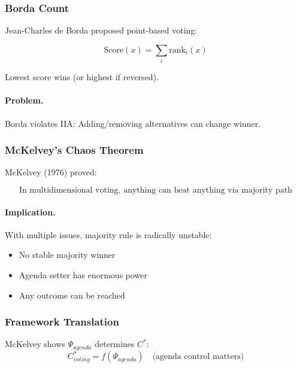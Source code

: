 \subsubsection{Borda Count}

Jean-Charles de Borda proposed point-based voting:

\begin{equation}
\text{Score}(x) = \sum_i \text{rank}_i(x)
\end{equation}

Lowest score wins (or highest if reversed).

\paragraph{Problem.}
Borda violates IIA: Adding/removing alternatives can change winner.

\subsubsection{McKelvey's Chaos Theorem}

McKelvey (1976) proved:

\begin{equation}
\boxed{
\text{In multidimensional voting, anything can beat anything via majority path}
}
\label{eq:mckelvey}
\end{equation}

\paragraph{Implication.}
With multiple issues, majority rule is radically unstable:
\begin{itemize}
    \item No stable majority winner
    \item Agenda setter has enormous power
    \item Any outcome can be reached
\end{itemize}

\subsubsection{Framework Translation}

McKelvey shows $\Psi_{agenda}$ determines $C^*$:
\begin{equation}
C^*_{voting} = f(\Psi_{agenda}) \quad \text{(agenda control matters)}
\end{equation}

